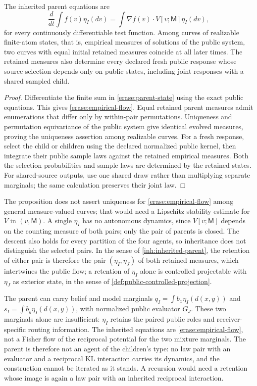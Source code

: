 The inherited parent equations are
\begin{equation}
 \frac{d}{dt}\int f(v)\eta_I(dv)
 =\int\nabla f(v)\cdot V[v;\mathsf M]\eta_I(dv),
 \label{erase:empirical-flow}
\end{equation}
for every continuously differentiable test function. Among curves of realizable finite-atom states, that is, empirical measures of solutions of the public system, two curves with equal initial retained measures coincide at all later times. The retained measures also determine every declared fresh public response whose source selection depends only on public states, including joint responses with a shared sampled child.
\begin{proof}
Differentiate the finite sum in \cref{erase:parent-state} using the exact public equations. This gives \cref{erase:empirical-flow}. Equal retained parent measures admit enumerations that differ only by within-pair permutations. Uniqueness and permutation equivariance of the public system give identical evolved measures, proving the uniqueness assertion among realizable curves. For a fresh response, select the child or children using the declared normalized public kernel, then integrate their public sample laws against the retained empirical measures. Both the selection probabilities and sample laws are determined by the retained states. For shared-source outputs, use one shared draw rather than multiplying separate marginals; the same calculation preserves their joint law.
\end{proof}

The proposition does not assert uniqueness for \cref{erase:empirical-flow} among general measure-valued curves; that would need a Lipschitz stability estimate for $V$ in $(v,\mathsf M)$. A single $\eta_I$ has no autonomous dynamics, since $V[v;\mathsf M]$ depends on the counting measure of both pairs; only the pair of parents is closed. The descent also holds for every partition of the four agents, so inheritance does not distinguish the selected pairs. In the sense of \cref{inh:inherited-parent}, the retention of either pair is therefore the pair $(\eta_I,\eta_J)$ of both retained measures, which intertwines the public flow; a retention of $\eta_I$ alone is controlled projectable with $\eta_J$ as exterior state, in the sense of \cref{def:public-controlled-projection}.

The parent can carry belief and model marginals $q_I=\int b_x\eta_I(d(x,y))$ and $s_I=\int b_y\eta_I(d(x,y))$, with normalized public evaluator $G_J$. These two marginals alone are insufficient: $\eta_I$ retains the paired public roles and receiver-specific routing information. The inherited equations are \cref{erase:empirical-flow}, not a Fisher flow of the reciprocal potential for the two mixture marginals. The parent is therefore not an agent of the children's type: no law pair with an evaluator and a reciprocal KL interaction carries its dynamics, and the construction cannot be iterated as it stands. A recursion would need a retention whose image is again a law pair with an inherited reciprocal interaction.

